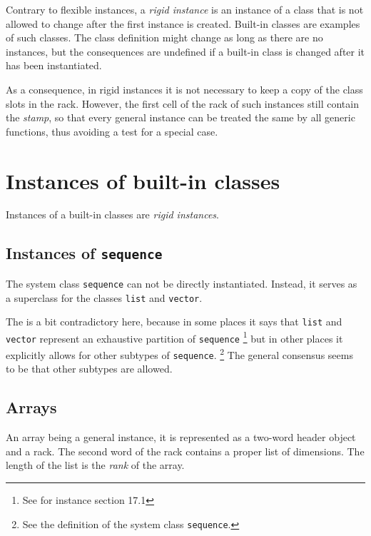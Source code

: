 Contrary to flexible instances, a \emph{rigid instance} is an instance
of a class that is not allowed to change after the first instance is
created.  Built-in classes are examples of such classes.  The class
definition might change as long as there are no instances, but the
consequences are undefined if a built-in class is changed after it has
been instantiated.

As a consequence, in rigid instances it is not necessary to keep a
copy of the class slots in the rack.  However, the first
cell of the rack of such instances still contain the
\emph{stamp}, so that every general instance can be treated the same
by all generic functions, thus avoiding a test for a special case.

\section{Instances of built-in classes}

Instances of a built-in classes are \emph{rigid instances}.

\subsection{Instances of \texttt{sequence}}

The system class \texttt{sequence} can not be directly instantiated.
Instead, it serves as a superclass for the classes \texttt{list} and
\texttt{vector}.

The \hs{} is a bit contradictory here, because
in some places it says that \texttt{list} and \texttt{vector}
represent an exhaustive partition of \texttt{sequence}%
\footnote{See for instance section 17.1}
but in other places it explicitly allows for other subtypes of
\texttt{sequence}.%
\footnote{See the definition of the system class \texttt{sequence}.}
The general consensus seems to be that other subtypes are allowed.


\subsection{Arrays}
\label{sec-data-representation-arrays}

An array being a general instance, it is represented as a two-word
header object and a rack.  The second word of the rack
contains a proper list of dimensions.  The length of the list
is the \emph{rank} of the array.


